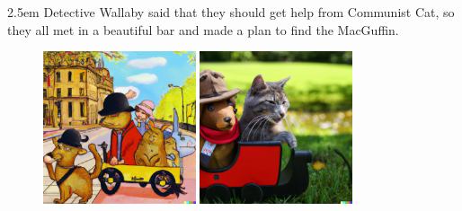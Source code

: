 \documentclass{article}
\newcommand{\imagewidthfactor}{0.4}
\newcommand{\addmarginA}{2.5em}
\newcommand{\addmarginB}{2.5em}
\begin{document}
\begin{addmargin}[\addmarginA]{\addmarginB}
Detective Wallaby said that they should get help from Communist Cat, so they all
met in a beautiful bar and made a plan to find the MacGuffin.
\end{addmargin}

\newpage %

\begin{figure}[h!]
\centering
\includegraphics[width=\imagewidthfactor\textwidth]{media/5a.png}
\quad
\includegraphics[width=\imagewidthfactor\textwidth]{media/5b.png}\\

\end{figure}
\end{document}
